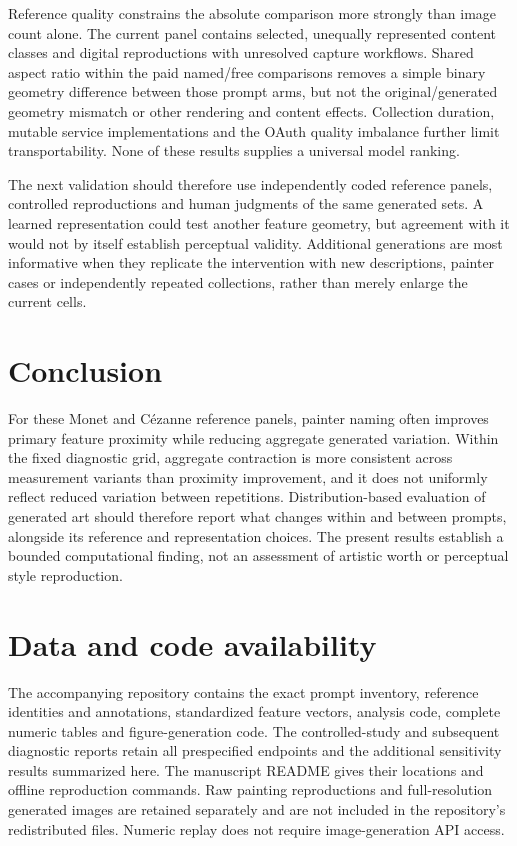 \documentclass[11pt]{article}
\begin{document}
Reference quality constrains the absolute comparison more strongly than image
count alone. The current panel contains selected, unequally represented content
classes and digital reproductions with unresolved capture workflows. Shared
aspect ratio within the paid named/free comparisons removes a simple binary
geometry difference between those prompt arms, but not the original/generated
geometry mismatch or other rendering and content effects. Collection duration,
mutable service implementations and the OAuth quality imbalance further limit
transportability. None of these results supplies a universal model ranking.

The next validation should therefore use independently coded reference panels,
controlled reproductions and human judgments of the same generated sets. A
learned representation could test another feature geometry, but agreement with
it would not by itself establish perceptual validity. Additional generations
are most informative when they replicate the intervention with new descriptions,
painter cases or independently repeated collections, rather than merely enlarge
the current cells.

\section{Conclusion}
For these Monet and C\'ezanne reference panels, painter naming often improves
primary feature proximity while reducing aggregate generated variation. Within the fixed diagnostic grid, aggregate
contraction is more consistent across measurement variants than proximity
improvement, and it does not uniformly reflect reduced variation between
repetitions. Distribution-based evaluation of generated art should therefore
report what changes within and between prompts, alongside its reference and
representation choices. The present results establish a bounded computational
finding, not an assessment of artistic worth or perceptual style reproduction.

\section*{Data and code availability}
The accompanying repository contains the exact prompt inventory, reference
identities and annotations, standardized feature vectors, analysis code, complete
numeric tables and figure-generation code. The controlled-study and subsequent
diagnostic reports retain all prespecified endpoints and the additional
sensitivity results summarized here. The manuscript README gives their locations
and offline reproduction commands. Raw painting reproductions and full-resolution
generated images are retained separately and are not included in the repository's
redistributed files. Numeric replay does not require image-generation API access.
\end{document}
